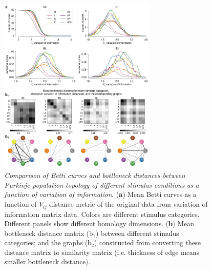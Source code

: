 \begin{figure}[H]
    \centering
    \includegraphics[width=0.7\textwidth,center]{../figures/report/Fig5.png}
    \caption{\label{fig:5}
    \textit{Comparison of Betti curves and bottleneck distances between Purkinje population topology of different stimulus conditions as a function of variation of information}.
    (\textbf{a}) Mean Betti curves as a function of $V_{ij}$  distance metric of the original data from variation of information matrix data. Colors are different stimulus categories. Different panels show different homology dimensions.
    (\textbf{b}) Mean bottleneck distance matrix (b$_1$) between different stimulus categories; and the graphs (b$_2$) constructed from converting these distance matrix to similarity matrix (i.e. thickness of edge means smaller bottleneck distance).
    }
\end{figure}

